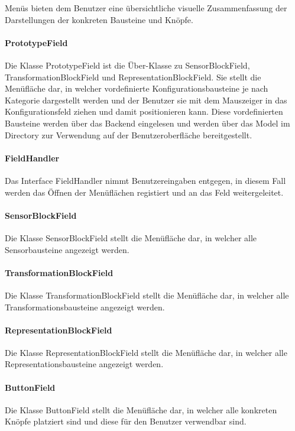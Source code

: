 \documentclass[parskip=full]{scrartcl}
\begin{document}
Menüs bieten dem Benutzer eine übersichtliche visuelle Zusammenfassung der Darstellungen der konkreten Bausteine und Knöpfe. 


\paragraph{PrototypeField}
Die Klasse PrototypeField ist die Über-Klasse zu SensorBlockField, TransformationBlockField und RepresentationBlockField. 
Sie stellt die Menüfläche dar, in welcher vordefinierte Konfigurationsbausteine je nach Kategorie dargestellt werden und der Benutzer sie mit dem Mauszeiger in das Konfigurationsfeld ziehen und damit positionieren kann. Diese vordefinierten Bausteine werden über das Backend eingelesen und werden über das Model im Directory zur Verwendung auf der Benutzeroberfläche bereitgestellt.

\paragraph{FieldHandler}
Das Interface FieldHandler nimmt Benutzereingaben entgegen, in diesem Fall werden das Öffnen der Menüflächen registiert und an das Feld weitergeleitet.

\paragraph{SensorBlockField}
Die Klasse SensorBlockField stellt die Menüfläche dar, in welcher alle Sensorbausteine angezeigt werden.

\paragraph{TransformationBlockField}
Die Klasse TransformationBlockField stellt die Menüfläche dar, in welcher alle Transformationsbausteine angezeigt werden.

\paragraph{RepresentationBlockField}
Die Klasse RepresentationBlockField stellt die Menüfläche dar, in welcher alle Representationsbausteine angezeigt werden.

\paragraph{ButtonField}
Die Klasse ButtonField stellt die Menüfläche dar, in welcher alle konkreten Knöpfe platziert sind und diese für den Benutzer verwendbar sind.
\end{document}
